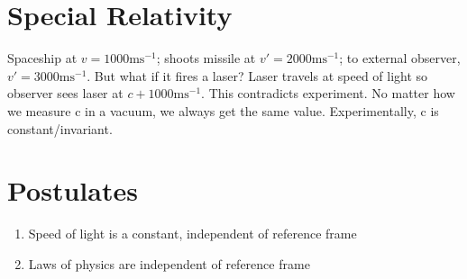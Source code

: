 \documentclass[a4paper, 11pt, normalem]{report}
\begin{document}
\section{Special Relativity}
Spaceship at $v = 1000\text{ms}^{-1}$; shoots missile at $v' = 2000\text{ms}^{-1}$; to external observer, $v' = 3000\text{ms}^{-1}$.
But what if it fires a laser?
Laser travels at speed of light so observer sees laser at $c + 1000\text{ms}^{-1}$.
This contradicts experiment.
No matter how we measure c in a vacuum, we always get the same value.
Experimentally, c is constant/invariant.

\section{Postulates}
\begin{enumerate}
    \item Speed of light is a constant, independent of reference frame
    \item Laws of physics are independent of reference frame
\end{enumerate}
\end{document}
